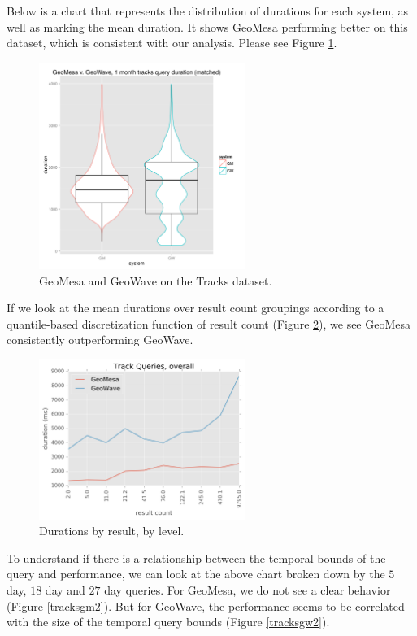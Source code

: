 Below is a chart that represents the distribution of durations for each system, as well as marking the mean duration.
It shows GeoMesa performing better on this dataset, which is consistent with our analysis.
Please see Figure \ref{tracksgmgw}.

\begin{figure}[h!tb]
  \centering
  \includegraphics[width=0.60\textwidth]{../docs/img/tracks/GM_GW_tracks_duration_matched_1month.png}
  \caption{GeoMesa and GeoWave on the Tracks dataset.}
  \label{tracksgmgw}
\end{figure}

If we look at the mean durations over result count groupings according to a quantile-based discretization function of result count
(Figure \ref{tracksdurationresult}),
we see GeoMesa consistently outperforming GeoWave.

\begin{figure}[h!tb]
  \centering
  \includegraphics[width=0.60\textwidth]{../docs/img/tracks/duration-by-result-count.png}
  \caption{Durations by result, by level.}
  \label{tracksdurationresult}
\end{figure}

To understand if there is a relationship between the temporal bounds of the query and performance,
we can look at the above chart broken down by the $5$ day, $18$ day and $27$ day queries.
For GeoMesa, we do not see a clear behavior (Figure \ref{tracksgm2}).
But for GeoWave, the performance seems to be correlated with the size of the temporal query bounds (Figure \ref{tracksgw2}).

